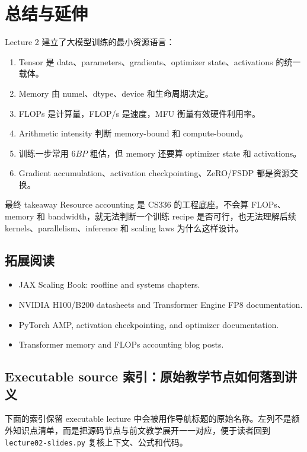 \section{总结与延伸}

Lecture 2 建立了大模型训练的最小资源语言：

\begin{enumerate}
    \item Tensor 是 data、parameters、gradients、optimizer state、activations 的统一载体。
    \item Memory 由 numel、dtype、device 和生命周期决定。
    \item FLOPs 是计算量，FLOP/s 是速度，MFU 衡量有效硬件利用率。
    \item Arithmetic intensity 判断 memory-bound 和 compute-bound。
    \item 训练一步常用 \(6BP\) 粗估，但 memory 还要算 optimizer state 和 activations。
    \item Gradient accumulation、activation checkpointing、ZeRO/FSDP 都是资源交换。
\end{enumerate}

\begin{importantbox}{最终 takeaway}
Resource accounting 是 CS336 的工程底座。不会算 FLOPs、memory 和 bandwidth，就无法判断一个训练 recipe 是否可行，也无法理解后续 kernels、parallelism、inference 和 scaling laws 为什么这样设计。
\end{importantbox}

\subsection{拓展阅读}

\begin{itemize}
    \item JAX Scaling Book: roofline and systems chapters.
    \item NVIDIA H100/B200 datasheets and Transformer Engine FP8 documentation.
    \item PyTorch AMP, activation checkpointing, and optimizer documentation.
    \item Transformer memory and FLOPs accounting blog posts.
\end{itemize}

\subsection{Executable source 索引：原始教学节点如何落到讲义}

下面的索引保留 executable lecture 中会被用作导航标题的原始名称。左列不是额外知识点清单，而是把源码节点与前文教学展开一一对应，便于读者回到 \texttt{lecture02-slides.py} 复核上下文、公式和代码。

